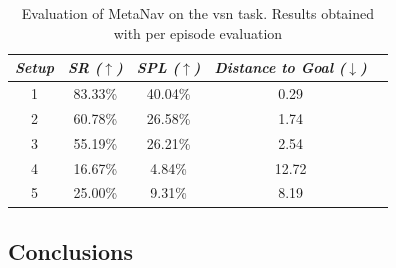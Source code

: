 \begin{table}[t]
    \centering
    \begin{tabular}{c|cccc}
        \toprule
        \textit{\textbf{Setup}} & \textit{\textbf{SR ($\uparrow$)}} & \textbf{\textit{SPL ($\uparrow$)}} & \textit{\textbf{Distance to Goal ($\downarrow$)}} \\ \midrule
        1                       & 83.33\%                           & 40.04\%                            & 0.29                                              \\
        2                       & 60.78\%                           & 26.58\%                            & 1.74                                              \\
        3                       & 55.19\%                           & 26.21\%                            & 2.54                                              \\
        4                       & 16.67\%                           & 4.84\%                             & 12.72                                             \\
        5                       & 25.00\%                           & 9.31\%                             & 8.19                                              \\
    \end{tabular}
    \caption{Evaluation of MetaNav on the \acrshort{vsn} task. Results obtained with per episode evaluation}
    \label{tab:metanav_episode}
\end{table}

\subsection{Conclusions}\label{subsec:conclusions_metanav}